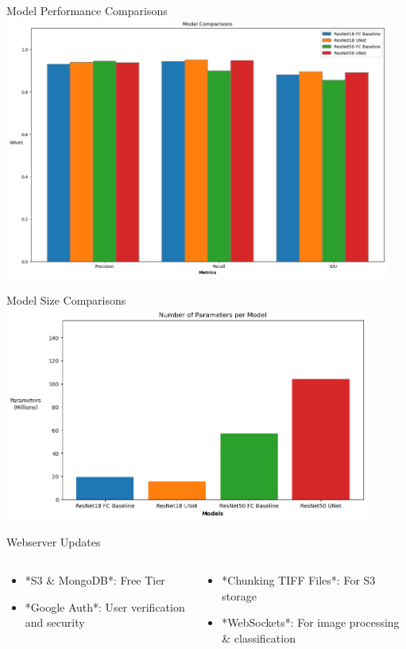 \begin{frame}{Model Performance Comparisons}
    \centering
    \includegraphics[height=0.9\textheight,width=0.95\textwidth,keepaspectratio]{images/mm_performance.png}
\end{frame}

\begin{frame}{Model Size Comparisons}
    \centering
    \includegraphics[height=0.9\textheight,width=0.9\textwidth,keepaspectratio]{images/mm_params.png}
\end{frame}

\begin{frame}{Webserver Updates}
    \begin{columns}
        \begin{column}{0.5\textwidth}
            \begin{itemize}
                \item *S3 & MongoDB*: Free Tier
                \item *Google Auth*: User verification and security
            \end{itemize}    
        \end{column}
        \begin{column}{0.5\textwidth}
            \begin{itemize}
                \item *Chunking TIFF Files*: For S3 storage
                \item *WebSockets*: For image processing & classification
            \end{itemize}    
        \end{column}
    \end{columns}
\end{frame}

